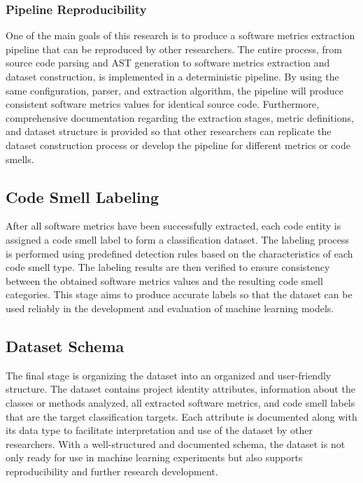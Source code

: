 \documentclass[]{einformatica}
\begin{document}
\subsubsection{Pipeline Reproducibility}

One of the main goals of this research is to produce a software metrics extraction pipeline that can be reproduced by other researchers. The entire process, from source code parsing and AST generation to software metrics extraction and dataset construction, is implemented in a deterministic pipeline. By using the same configuration, parser, and extraction algorithm, the pipeline will produce consistent software metrics values ​​for identical source code. Furthermore, comprehensive documentation regarding the extraction stages, metric definitions, and dataset structure is provided so that other researchers can replicate the dataset construction process or develop the pipeline for different metrics or code smells.

\subsection{Code Smell Labeling}

After all software metrics have been successfully extracted, each code entity is assigned a code smell label to form a classification dataset. The labeling process is performed using predefined detection rules based on the characteristics of each code smell type. The labeling results are then verified to ensure consistency between the obtained software metrics values ​​and the resulting code smell categories. This stage aims to produce accurate labels so that the dataset can be used reliably in the development and evaluation of machine learning models.

\subsection{Dataset Schema}

The final stage is organizing the dataset into an organized and user-friendly structure. The dataset contains project identity attributes, information about the classes or methods analyzed, all extracted software metrics, and code smell labels that are the target classification targets. Each attribute is documented along with its data type to facilitate interpretation and use of the dataset by other researchers. With a well-structured and documented schema, the dataset is not only ready for use in machine learning experiments but also supports reproducibility and further research development.
\end{document}
